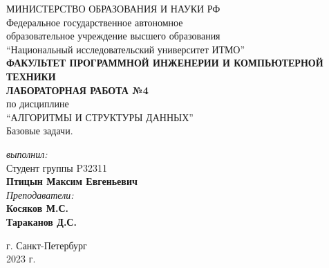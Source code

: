 \begin{center}
	МИНИСТЕРСТВО ОБРАЗОВАНИЯ И НАУКИ РФ\\
	\hfill \break
	Федеральное государственное автономное\\
	образовательное учреждение высшего образования\\
	``Национальный исследовательский университет ИТМО''\\
	\hfill \break
	\textbf{ФАКУЛЬТЕТ ПРОГРАММНОЙ ИНЖЕНЕРИИ И КОМПЬЮТЕРНОЙ ТЕХНИКИ}\\
	\vspace{2cm}
	\large{\textbf{ЛАБОРАТОРНАЯ РАБОТА №4}}\\
	\hfill \break
	по дисциплине\\
	\large{``АЛГОРИТМЫ И СТРУКТУРЫ ДАННЫХ''}\\
	Базовые задачи.\\
	\hfill \break
	\vspace{3cm}
	\begin{flushright}
	\textit{выполнил:}\\
	Студент группы P32311\\
	\textbf{Птицын Максим Евгеньевич}\\
	\textit{Преподаватели:}\\
	\textbf{Косяков М.С.} \\
	\textbf{Тараканов Д.С.}
	\end{flushright}
\end{center}

\vfill

\begin{center} г. Санкт-Петербург\\2023 г.
\end{center}
\thispagestyle{empty}

\newpage
